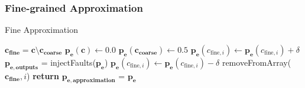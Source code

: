 \documentclass[conference]{IEEEtran}
\begin{document}
\subsubsection{Fine-grained Approximation}
\begin{algorithm}[b]
  \caption{Fine Approximation}\label{alg:fine_approximation}
  \begin{algorithmic}[1]
    \State $\mathbf{c_{fine}} = \mathbf{c} \setminus \mathbf{c_{coarse}}$
    \State $\mathbf{p_e}(\mathbf{c}) \gets 0.0$
    \State $\mathbf{p_e}(\mathbf{c_{coarse}}) \gets 0.5$
    \State $\mathbf{p_e}(c_{\textrm{fine},i}) \gets \mathbf{p_e}(c_{\textrm{fine},i}) + \delta$
    \State $\mathbf{p_{e,outputs}}$ = injectFaults($\mathbf{p_e}$)
    \State $\mathbf{p_e}(c_{\textrm{fine},i}) \gets \mathbf{p_e}(c_{\textrm{fine},i}) - \delta$
    \State removeFromArray($\mathbf{c_{fine}},i$)
    \EndIf
    \EndFor
    \EndWhile
    \State \textbf{return} $\mathbf{p_{e,approximation}}$ = $\mathbf{p_e}$
    \EndProcedure
  \end{algorithmic}
\end{algorithm}
\end{document}

